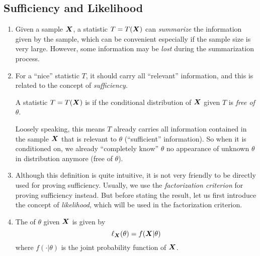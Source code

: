 \subsection{Sufficiency and Likelihood}
\begin{enumerate}
\item Given a sample \(\vb*{X}\), a statistic \(T=T(\vb*{X})\) can
\emph{summarize} the information given by the sample, which can be convenient
especially if the sample size is very large. However, some information may be
\emph{lost} during the summarization process.

\item For a ``nice'' statistic \(T\), it should carry all ``relevant''
information, and this is related to the concept of \emph{sufficiency}.

A statistic \(T=T(\vb*{X})\) is  if the
conditional distribution of \(\vb*{X}\) given \(T\) is \emph{free of \(\theta\)}.

\begin{note}
Loosely speaking, this means \(T\) already carries all information contained in
the sample \(\vb*{X}\) that is relevant to \(\theta\) (``sufficient''
information). So when it is conditioned on, we already ``completely know''
\(\theta\)  no appearance of unknown \(\theta\) in
distribution anymore (free of \(\theta\)).
\end{note}

\item Although this definition is quite intuitive, it is not very friendly to
be directly used for proving sufficiency. Usually, we use the
\emph{factorization criterion} for proving sufficiency instead. But before
stating the result, let us first introduce the concept of \emph{likelihood},
which will be used in the factorization criterion.

\item The  of \(\theta\) given \(\vb*{X}\) is given
by
\[\ell_{\vb*{X}}\qty(\theta)=f(\vb*{X}|\theta)\]
where \(f(\cdot|\theta)\) is the joint probability function of \(\vb*{X}\).



\end{enumerate}
